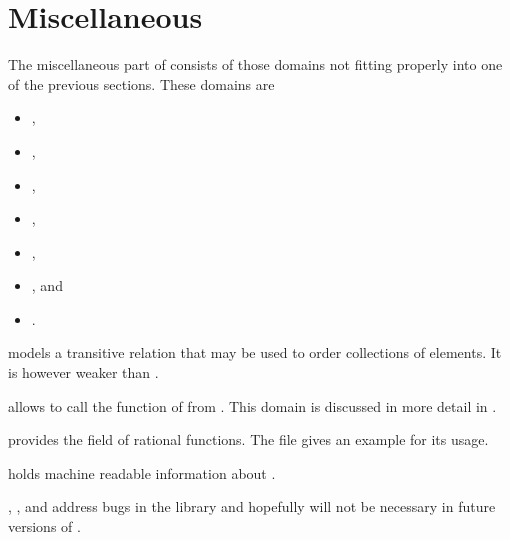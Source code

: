 \clearpage
\section{Miscellaneous}

The miscellaneous part of \LibCharSet consists of those domains not fitting properly into one of the previous sections. These domains are

\begin{itemize}
\item {},
\item {},
\item {},
\item {},
\item {},
\item {}, and
\item {}.
\end{itemize}

 models a transitive relation that may be used to order collections of elements. It is however weaker than .

 allows to call the  function of  from \C. This domain is discussed in more detail in .

 provides the field of rational functions. The file  gives an example for its usage.




 holds machine readable information about \LibCharSet.

, , and  address bugs in the \LibAlgebra library and hopefully will not be necessary in future versions of \LibCharSet.

